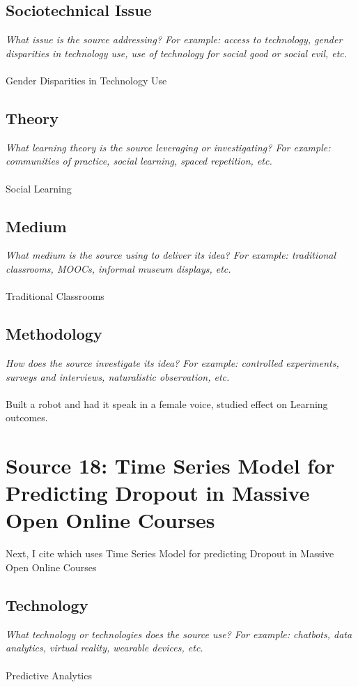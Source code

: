 \documentclass[12pt, final]{article}
\begin{document}
\subsection{Sociotechnical Issue}
\textit{What issue is the source addressing? For example: access to technology, gender disparities in technology use, use of technology for social good or social evil, etc.}
\\
\\
Gender Disparities in Technology Use

\subsection{Theory}
\textit{What learning theory is the source leveraging or investigating? For example: communities of practice, social learning, spaced repetition, etc.}
\\
\\
Social Learning

\subsection{Medium}
\textit{What medium is the source using to deliver its idea? For example: traditional classrooms, MOOCs, informal museum displays, etc.}
\\
\\
Traditional Classrooms

\subsection{Methodology}
\textit{How does the source investigate its idea? For example: controlled experiments, surveys and interviews, naturalistic observation, etc.}
\\
\\
Built a robot and had it speak in a female voice, studied effect on Learning outcomes.

\section{Source 18: Time Series Model for Predicting Dropout in Massive Open Online Courses}
\label{Source 18}

Next, I cite \cite{Tang} which uses Time Series Model for predicting Dropout in Massive Open Online Courses

\subsection{Technology}
\textit{What technology or technologies does the source use? For example: chatbots, data analytics, virtual reality, wearable devices, etc.}
\\
\\
Predictive Analytics
\end{document}
